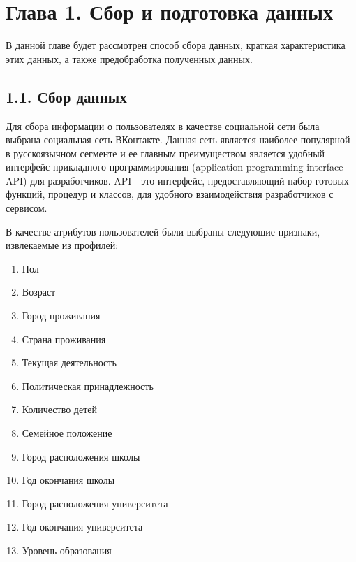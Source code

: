 \section{Глава 1. Сбор и подготовка данных}

В данной главе будет рассмотрен способ сбора данных, краткая характеристика этих данных, а также предобработка полученных данных.

\subsection{1.1. Сбор данных}

Для сбора информации о пользователях в качестве социальной сети была выбрана социальная сеть ВКонтакте. Данная сеть является наиболее популярной в русскоязычном сегменте и ее главным преимуществом является удобный интерфейс прикладного программирования (application programming interface - API) для разработчиков. API - это интерфейс, предоставляющий набор готовых функций, процедур и классов, для удобного взаимодействия разработчиков с сервисом. 

В качестве атрибутов пользователей были выбраны следующие признаки, извлекаемые из профилей:
\begin{enumerate}
\item Пол
\item Возраст
\item Город проживания
\item Страна проживания
\item Текущая деятельность
\item Политическая принадлежность
\item Количество детей
\item Семейное положение
\item Город расположения школы
\item Год окончания школы
\item Город расположения университета
\item Год окончания университета
\item Уровень образования
\end{enumerate}

